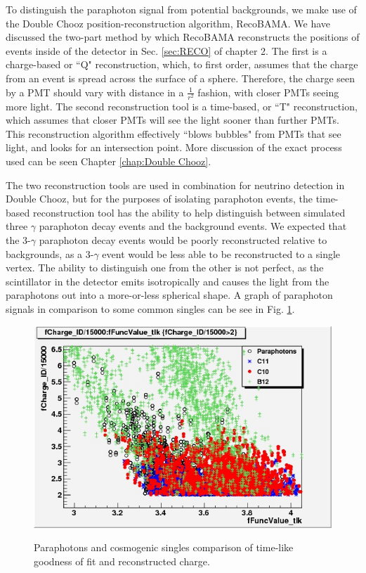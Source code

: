  To distinguish the paraphoton signal from potential backgrounds, we make use of the Double Chooz position-reconstruction algorithm, RecoBAMA. We have discussed the two-part method by which RecoBAMA reconstructs the positions of events inside of the detector in Sec. \ref{sec:RECO} of chapter 2. The first is a charge-based or ``Q" reconstruction, which, to first order, assumes that the charge from an event is spread across the surface of a sphere. Therefore, the charge seen by a PMT should vary with distance in a $\frac{1}{r^2}$ fashion, with closer PMTs seeing more light. The second reconstruction tool is a time-based, or ``T" reconstruction, which assumes that closer PMTs will see the light sooner than further PMTs. This reconstruction algorithm effectively ``blows bubbles" from PMTs that see light, and looks for an intersection point. More discussion of the exact process used can be seen Chapter \ref{chap:Double Chooz}.
 
The two reconstruction tools are used in combination for neutrino detection in Double Chooz, but for the purposes of isolating paraphoton events, the time-based reconstruction tool has the ability to help distinguish between simulated three $\gamma$ paraphoton decay events and the background events. We expected that the 3-$\gamma$ paraphoton decay events would be poorly reconstructed relative to backgrounds, as a 3-$\gamma$ event would be less able to be reconstructed to a single vertex. The ability to distinguish one from the other is not perfect, as the scintillator in the detector emits isotropically and causes the light from the paraphotons out into a more-or-less spherical shape. A graph of paraphoton signals in comparison to some common singles can be see in Fig. \ref{ParaVMC}.

\begin{figure}
\caption{Paraphotons and cosmogenic singles comparison of time-like goodness of fit and reconstructed charge.}
\includegraphics[width=\textwidth]{Paraphotons/ParaphotonsVMC.jpg}
\label{ParaVMC}
\end{figure}

